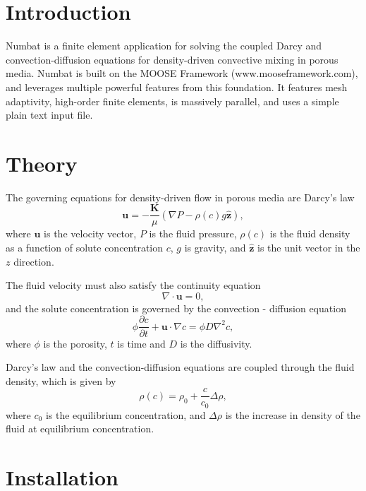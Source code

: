 \documentclass[11pt, a4paper]{csiroreport2012}
\begin{document}
\section{Introduction}

Numbat is a finite element application for solving the coupled Darcy and convection-diffusion equations for density-driven convective mixing in porous media. Numbat is built on the MOOSE Framework (www.mooseframework.com), and leverages multiple powerful features from this foundation. It features mesh adaptivity, high-order finite elements, is massively parallel, and uses a simple plain text input file. 

\section{Theory}

The governing equations for density-driven flow in porous media are Darcy's law
\begin{equation}
\mathbf{u} = - \frac{\mathbf{K}}{\mu} \left(\nabla P - \rho(c) g \hat{\mathbf{z}} \right),
\label{eq:darcy}
\end{equation}
where $\mathbf{u}$ is the velocity vector, $P$ is the fluid pressure, $\rho(c)$ is the fluid density as a function of solute concentration $c$, $g$ is gravity, and $\hat{\mathbf{z}}$ is the unit vector in the $z$ direction.

The fluid velocity must also satisfy the continuity equation
\begin{equation}
\nabla \cdot \mathbf{u} = 0,
\end{equation}
and the solute concentration is governed by the convection - diffusion equation
\begin{equation}
\phi \frac{\partial c}{\partial t} + \mathbf{u} \cdot \nabla c = \phi D \nabla^2 c,
\label{eq:convdiff}
\end{equation}
where $\phi$ is the porosity, $t$ is time and $D$ is the diffusivity. 

Darcy's law and the convection-diffusion equations are coupled through the fluid density, which is given by
\begin{equation}
\rho(c) = \rho_0 + \frac{c}{c_0} \Delta \rho,
\label{eq:density}
\end{equation}
where $c_0$ is the equilibrium concentration, and $\Delta \rho$ is the increase in density of the fluid at equilibrium concentration.

\section{Installation}
\end{document}

